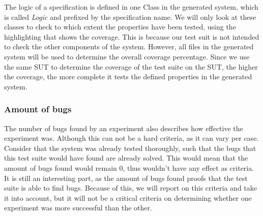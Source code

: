 \FloatBarrier
The logic of a specification is defined in one Class in the generated system, which is called \textit{Logic} and prefixed by the specification name. We will only look at these classes to check to which extent the properties have been tested, using the highlighting that shows the coverage. This is because our test suit is not intended to check the other components of the system. However, all files in the generated system will be used to determine the overall coverage percentage. Since we use the same SUT to determine the coverage of the test suite on the SUT, the higher the coverage, the more complete it tests the defined properties in the generated system.

\subsubsection{Amount of bugs}
The number of bugs found by an experiment also describes how effective the experiment was. Although this can not be a hard criteria, as it can vary per case. Consider that the system was already tested thoroughly, such that the bugs that this test suite would have found are already solved. This would mean that the amount of bugs found would remain 0, thus wouldn't have any effect as criteria. It is still an interesting part, as the amount of bugs found proofs that the test suite is able to find bugs. Because of this, we will report on this criteria and take it into account, but it will not be a critical criteria on determining whether one experiment was more successful than the other.



